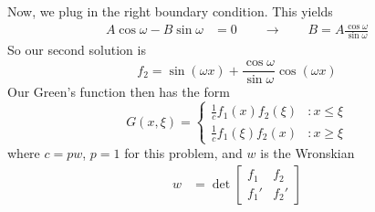 \documentclass[10pt,letterpaper]{report}
\newcommand{\so}{\qquad \rightarrow \qquad}
\newcommand{\mtx}[2]{\left[\begin{array}{#1}#2\end{array}\right]}
\begin{document}
\begin{enumerate}
\begin{enumerate}
    Now, we plug in the right boundary condition. This yields
    \begin{align*}
        A \cos \omega - B\sin\omega &= 0
        \so
        B = A \frac{\cos \omega}{\sin \omega}
    \end{align*}
    So our second solution is
    \[
    f_2 = \sin(\omega x) + \frac{\cos \omega}{\sin \omega}\cos(\omega x)
    \]
    Our Green's function then has the form
    \[
    G(x, \xi) = \begin{cases}
    \frac{1}{c}f_1(x)f_2(\xi) &: x \leq \xi \\
    \frac{1}{c}f_1(\xi)f_2(x) &: x \geq \xi
    \end{cases}
    \]
    where $c = pw$, $p = 1$ for this problem, and $w$ is the Wronskian
    \begin{align*}
        w &= \det \mtx{cc}{f_1 & f_2 \\ f_1' & f_2'} \\

\end{align*}
\end{enumerate}
\end{enumerate}
\end{document}
